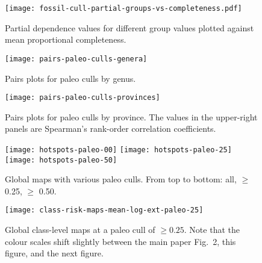 \documentclass[11pt]{article}
\begin{document}
\clearpage

\begin{figure}[htbp]
\begin{center}
\texttt{[image: fossil-cull-partial-groups-vs-completeness.pdf]}
\caption{Partial dependence values for different group values plotted against mean proportional completeness.}
\label{fig:ext-prop-compl-scatter}
\end{center}
\end{figure}

\clearpage

\begin{figure}[htbp]
\begin{center}
\texttt{[image: pairs-paleo-culls-genera]}
\caption{Pairs plots for paleo culls by genus.}
\label{fig:pairs-genus-paleo-culls}
\end{center}
\end{figure}

\clearpage

\begin{figure}[htbp]
\begin{center}
\texttt{[image: pairs-paleo-culls-provinces]}
\caption{Pairs plots for paleo culls by province. The values in the upper-right panels are Spearman's rank-order correlation coefficients.}
\label{fig:pairs-prov-paleo-culls}
\end{center}
\end{figure}

\clearpage


\begin{figure}[htbp]
\begin{center}
\texttt{[image: hotspots-paleo-00]}
\texttt{[image: hotspots-paleo-25]}
\texttt{[image: hotspots-paleo-50]}
\caption{Global maps with various paleo culls. From top to bottom: all, $\ge$ 0.25, $\ge$ 0.50.}
\label{fig:overall-maps-paleo-culls}
\end{center}
\end{figure}

\begin{figure}[htbp]
\begin{center}
\texttt{[image: class-risk-maps-mean-log-ext-paleo-25]}
\caption{Global class-level maps at a paleo cull of $\ge 0.25$. Note that the colour scales shift slightly between the main paper Fig.\ 2, this figure, and the next figure.}
\label{fig:class-maps-paleo-cull-0.25}
\end{center}
\end{figure}
\end{document}
